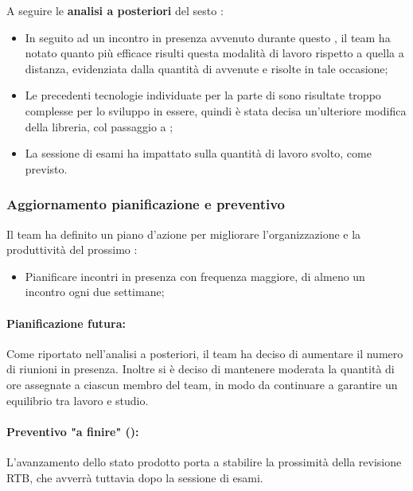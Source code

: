 \vspace{0.5\baselineskip}
\par A seguire le \textbf{analisi a posteriori} del sesto :
\begin{itemize}
  \item In seguito ad un incontro in presenza avvenuto durante questo , il team ha notato quanto più efficace risulti questa modalità di lavoro rispetto a quella a distanza, evidenziata dalla quantità di  avvenute e risolte in tale occasione;
  \item Le precedenti tecnologie individuate per la parte di  sono risultate troppo complesse per lo sviluppo in essere, quindi è stata decisa un'ulteriore modifica della libreria, col passaggio a ;
  \item La sessione di esami ha impattato sulla quantità di lavoro svolto, come previsto.
\end{itemize}

\subsubsection{Aggiornamento pianificazione e preventivo}
\par Il team ha definito un piano d'azione per migliorare l'organizzazione e la produttività del prossimo :
\begin{itemize}
  \item Pianificare incontri in presenza con frequenza maggiore, di almeno un incontro ogni due settimane;
\end{itemize}

\paragraph*{Pianificazione futura:}
\par Come riportato nell'analisi a posteriori, il team ha deciso di aumentare il numero di riunioni in presenza.
Inoltre si è deciso di mantenere moderata la quantità di ore assegnate a ciascun membro del team, in modo da continuare a garantire un equilibrio tra lavoro e studio.

\paragraph*{Preventivo "a finire" ():}
\par L'avanzamento dello stato prodotto porta a stabilire la prossimità della revisione RTB, che avverrà tuttavia dopo la sessione di esami.

